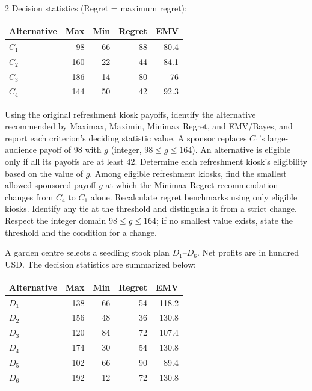 \begin{multicols}{2}
Decision statistics (Regret = maximum regret):

\begin{center}\small\setlength{\tabcolsep}{4pt}
	\begin{tabular}{lrrrr}\toprule
		Alternative & Max & Min & Regret & EMV\\ \midrule
				$C_1$ & 98 & 66 & 88 & 80.4\\
		$C_2$ & 160 & 22 & 44 & 84.1\\
		$C_3$ & 186 & -14 & 80 & 76\\
		$C_4$ & 144 & 50 & 42 & 92.3\\
		\bottomrule
	\end{tabular}
\end{center}

\noindent Using the original refreshment kiosk payoffs, identify the alternative recommended by Maximax, Maximin, Minimax Regret, and EMV/Bayes, and report each criterion's deciding statistic value.  A sponsor replaces $C_1$'s large-audience payoff of 98 with $g$ (integer, $98\leq g\leq164$). An alternative is eligible only if all its payoffs are at least 42. Determine each refreshment kiosk's eligibility based on the value of $g$.  Among eligible refreshment kiosks, find the smallest allowed sponsored payoff $g$ at which the Minimax Regret recommendation changes from $C_4$ to $C_1$ alone. Recalculate regret benchmarks using only eligible kiosks. Identify any tie at the threshold and distinguish it from a strict change. Respect the integer domain $98\leq g\leq164$; if no smallest value exists, state the threshold and the condition for a change. 

A garden centre selects a seedling stock plan $D_1$--$D_6$. Net profits are in hundred USD. The decision statistics are summarized below:

\vspace{-3mm}
\begin{center}\small\setlength{\tabcolsep}{4pt}
	\begin{tabular}{lrrrr}\toprule
		Alternative & Max & Min & Regret & EMV\\ \midrule
		$D_1$ & 138 & 66 & 54 & 118.2\\
		$D_2$ & 156 & 48 & 36 & 130.8\\
		$D_3$ & 120 & 84 & 72 & 107.4\\
		$D_4$ & 174 & 30 & 54 & 130.8\\
		$D_5$ & 102 & 66 & 90 & 89.4\\
		$D_6$ & 192 & 12 & 72 & 130.8\\
		\bottomrule
	\end{tabular}
\end{center}
\vspace{-3mm}


\end{multicols}
